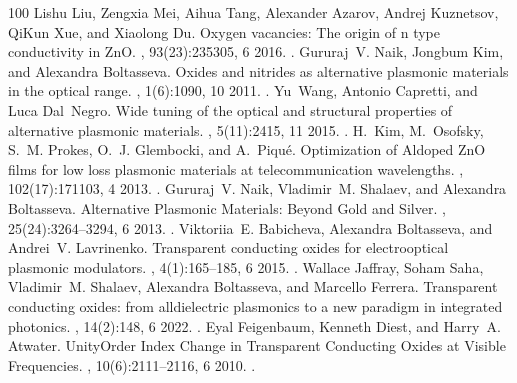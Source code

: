 \documentclass[a4paper,10pt,english,openany,oneside]{jupyterBook}
\begin{document}
\begin{sphinxthebibliography}{100}
\sphinxAtStartPar
Lishu Liu, Zengxia Mei, Aihua Tang, Alexander Azarov, Andrej Kuznetsov, Qi\sphinxhyphen{}Kun Xue, and Xiaolong Du. Oxygen vacancies: The origin of n \sphinxhyphen{}type conductivity in ZnO. , 93(23):235305, 6 2016. .
\sphinxAtStartPar
Gururaj V. Naik, Jongbum Kim, and Alexandra Boltasseva. Oxides and nitrides as alternative plasmonic materials in the optical range. , 1(6):1090, 10 2011. .
\sphinxAtStartPar
Yu Wang, Antonio Capretti, and Luca Dal Negro. Wide tuning of the optical and structural properties of alternative plasmonic materials. , 5(11):2415, 11 2015. .
\sphinxAtStartPar
H. Kim, M. Osofsky, S. M. Prokes, O. J. Glembocki, and A. Piqué. Optimization of Al\sphinxhyphen{}doped ZnO films for low loss plasmonic materials at telecommunication wavelengths. , 102(17):171103, 4 2013. .
\sphinxAtStartPar
Gururaj V. Naik, Vladimir M. Shalaev, and Alexandra Boltasseva. Alternative Plasmonic Materials: Beyond Gold and Silver. , 25(24):3264–3294, 6 2013. .
\sphinxAtStartPar
Viktoriia E. Babicheva, Alexandra Boltasseva, and Andrei V. Lavrinenko. Transparent conducting oxides for electro\sphinxhyphen{}optical plasmonic modulators. , 4(1):165–185, 6 2015. .
\sphinxAtStartPar
Wallace Jaffray, Soham Saha, Vladimir M. Shalaev, Alexandra Boltasseva, and Marcello Ferrera. Transparent conducting oxides: from all\sphinxhyphen{}dielectric plasmonics to a new paradigm in integrated photonics. , 14(2):148, 6 2022. .
\sphinxAtStartPar
Eyal Feigenbaum, Kenneth Diest, and Harry A. Atwater. Unity\sphinxhyphen{}Order Index Change in Transparent Conducting Oxides at Visible Frequencies. , 10(6):2111–2116, 6 2010. .

\end{sphinxthebibliography}
\end{document}
